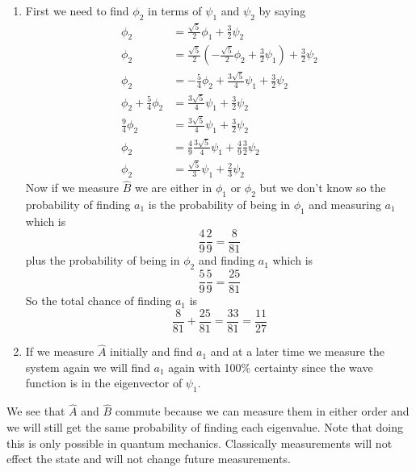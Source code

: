\documentclass[11pt]{article}
\numberwithin{equation}{section}
\begin{document}
\begin{enumerate}[(a)]
\begin{enumerate}[i]
\item
First we need to find $\phi_2$ in terms of $\psi_1$ and $\psi_2$ by saying
\begin{align*}
\phi_2 &= \frac{\sqrt{5}}{2}\phi_1 + \frac{3}{2}\psi_2\\
\phi_2 &= \frac{\sqrt{5}}{2}\left(-\frac{\sqrt{5}}{2}\phi_2 + \frac{3}{2}\psi_1\right) + \frac{3}{2}\psi_2\\
\phi_2 &= -\frac{5}{4}\phi_2 + \frac{3\sqrt{5}}{4}\psi_1 + \frac{3}{2}\psi_2\\
\phi_2 +\frac{5}{4}\phi_2 &=  \frac{3\sqrt{5}}{4}\psi_1 + \frac{3}{2}\psi_2\\
\frac{9}{4}\phi_2 &=  \frac{3\sqrt{5}}{4}\psi_1 + \frac{3}{2}\psi_2\\
\phi_2 &=  \frac{4}{9}\frac{3\sqrt{5}}{4}\psi_1 + \frac{4}{9}\frac{3}{2}\psi_2\\
\phi_2 &=  \frac{\sqrt{5}}{3}\psi_1 + \frac{2}{3}\psi_2
\end{align*}
Now if we measure $\hat{B}$ we are either in $\phi_1$ or $\phi_2$ but we don't know so the probability of finding $a_1$ is the probability of being in $\phi_1$ and measuring $a_1$ which is
$$\frac{4}{9}\frac{2}{9} = \frac{8}{81}$$
plus the probability of being in $\phi_2$ and finding $a_1$ which is
$$\frac{5}{9}\frac{5}{9} = \frac{25}{81}$$
So the total chance of finding $a_1$ is
$$\frac{8}{81}+\frac{25}{81} = \frac{33}{81} = \frac{11}{27}$$

\item
If we measure $\hat{A}$ initially and find $a_1$ and at a later time we measure the system again we will find $a_1$ again with 100\% certainty since the wave function is in the eigenvector of $\psi_1$.
\end{enumerate}

We see that $\hat{A}$ and $\hat{B}$ commute because we can measure them in either order and we will still get the same probability of finding each eigenvalue. Note that doing this is only possible in quantum mechanics. Classically measurements will not effect the state and will not change future measurements. 
\end{enumerate}
\end{document}
